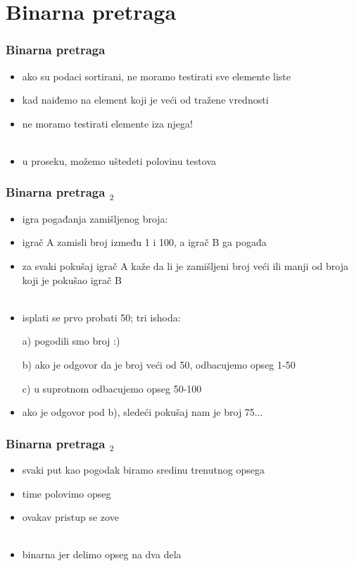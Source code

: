 \documentclass[utf8,compress,aspectratio=169]{beamer}
\begin{document}
\section[Binarna]{Binarna pretraga}

\begin{frame}[fragile]
  \frametitle{Binarna pretraga}
  \begin{itemize}
    \item ako su podaci sortirani, ne moramo testirati sve elemente liste
    \item kad naiđemo na element koji je veći od tražene vrednosti
    \item ne moramo testirati elemente iza njega! \\ \ \\
    \item u proseku, možemo uštedeti polovinu testova
  \end{itemize}
\end{frame}

\begin{frame}[fragile]
  \frametitle{Binarna pretraga $_2$}
  \begin{itemize}
    \item igra pogađanja zamišljenog broja:
    \item igrač A zamisli broj između 1 i 100, a igrač B ga pogađa
    \item za svaki pokušaj igrač A kaže da li je zamišljeni broj veći
      ili manji od broja koji je pokušao igrač B \\ \ \\
    \item isplati se prvo probati 50; tri ishoda:
    \item[a)] pogodili smo broj :)
    \item[b)] ako je odgovor da je broj veći od 50, odbacujemo opseg 1-50
    \item[c)] u suprotnom odbacujemo opseg 50-100
    \item ako je odgovor pod b), sledeći pokušaj nam je broj 75...
  \end{itemize}
\end{frame}

\begin{frame}[fragile]
  \frametitle{Binarna pretraga $_2$}
  \begin{itemize}
    \item svaki put kao pogodak biramo sredinu trenutnog opsega
    \item time polovimo opseg
    \item ovakav pristup se zove  \\ \ \\
    \item binarna jer delimo opseg na dva dela
  \end{itemize}
\end{frame}
\end{document}
